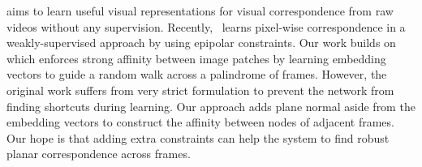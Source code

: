 \cite{CVPR2019_CycleTime, jabri2020walk} aims to learn useful visual representations for visual correspondence from raw videos without any supervision. Recently,~\cite{huang2021life} learns pixel-wise correspondence in a weakly-supervised approach by using epipolar constraints.
Our work builds on~\cite{jabri2020walk} which enforces strong affinity between image patches by learning embedding vectors to guide a random walk across a palindrome of frames. However, the original work suffers from very strict formulation to prevent the network from finding shortcuts during learning. Our approach adds plane normal aside from the embedding vectors to construct the affinity between nodes of adjacent frames. Our hope is that adding extra constraints can help the system to find robust planar correspondence across frames.

